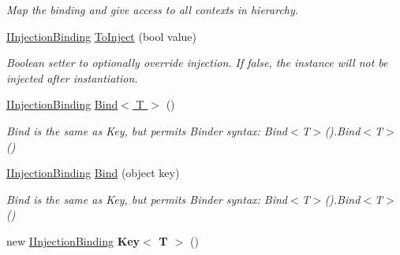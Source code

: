 \begin{DoxyCompactItemize}
\begin{DoxyCompactList}\small\item\em Map the binding and give access to all contexts in hierarchy. \end{DoxyCompactList}\item 
\hypertarget{classstrange_1_1extensions_1_1injector_1_1impl_1_1_injection_binding_a03d3a22f0e3cad47d20c337d7a5aa224}{\hyperlink{interfacestrange_1_1extensions_1_1injector_1_1api_1_1_i_injection_binding}{I\-Injection\-Binding} \hyperlink{classstrange_1_1extensions_1_1injector_1_1impl_1_1_injection_binding_a03d3a22f0e3cad47d20c337d7a5aa224}{To\-Inject} (bool value)}\label{classstrange_1_1extensions_1_1injector_1_1impl_1_1_injection_binding_a03d3a22f0e3cad47d20c337d7a5aa224}

\begin{DoxyCompactList}\small\item\em Boolean setter to optionally override injection. If false, the instance will not be injected after instantiation. \end{DoxyCompactList}\item 
\hypertarget{classstrange_1_1extensions_1_1injector_1_1impl_1_1_injection_binding_aa554c0eb764085090478664db21467df}{\hyperlink{interfacestrange_1_1extensions_1_1injector_1_1api_1_1_i_injection_binding}{I\-Injection\-Binding} \hyperlink{classstrange_1_1extensions_1_1injector_1_1impl_1_1_injection_binding_aa554c0eb764085090478664db21467df}{Bind$<$ T $>$} ()}\label{classstrange_1_1extensions_1_1injector_1_1impl_1_1_injection_binding_aa554c0eb764085090478664db21467df}

\begin{DoxyCompactList}\small\item\em Bind is the same as Key, but permits Binder syntax\-: {\ttfamily Bind$<$T$>$().Bind$<$T$>$()} \end{DoxyCompactList}\item 
\hypertarget{classstrange_1_1extensions_1_1injector_1_1impl_1_1_injection_binding_af14ba168b6cc7a2624fe035a933b7c33}{\hyperlink{interfacestrange_1_1extensions_1_1injector_1_1api_1_1_i_injection_binding}{I\-Injection\-Binding} \hyperlink{classstrange_1_1extensions_1_1injector_1_1impl_1_1_injection_binding_af14ba168b6cc7a2624fe035a933b7c33}{Bind} (object key)}\label{classstrange_1_1extensions_1_1injector_1_1impl_1_1_injection_binding_af14ba168b6cc7a2624fe035a933b7c33}

\begin{DoxyCompactList}\small\item\em Bind is the same as Key, but permits Binder syntax\-: {\ttfamily Bind$<$T$>$().Bind$<$T$>$()} \end{DoxyCompactList}\item 
\hypertarget{classstrange_1_1extensions_1_1injector_1_1impl_1_1_injection_binding_aef52ed6a0ff8e7fffacce72b3d1b4c19}{new \hyperlink{interfacestrange_1_1extensions_1_1injector_1_1api_1_1_i_injection_binding}{I\-Injection\-Binding} {\bfseries Key$<$ T $>$} ()}\label{classstrange_1_1extensions_1_1injector_1_1impl_1_1_injection_binding_aef52ed6a0ff8e7fffacce72b3d1b4c19}


\end{DoxyCompactItemize}
